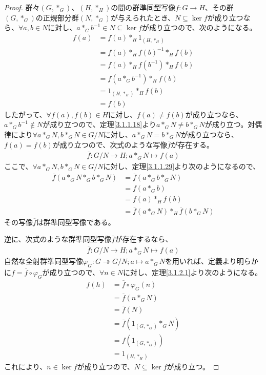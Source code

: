 \documentclass[dvipdfmx]{jsarticle}
\begin{document}
\begin{proof}
群々$\left( G,*_{G} \right)$、$\left( H,*_{H} \right)$の間の群準同型写像$f:G \rightarrow H$、その群$\left( G,*_{G} \right)$の正規部分群$\left( N,*_{G} \right)$が与えられたとき、$N \subseteq \ker f$が成り立つなら、$\forall a,b \in N$に対し、$a*_{G}b^{- 1} \in N \subseteq \ker f$が成り立つので、次のようになる。
\begin{align*}
f(a) &= f(a)*_{H}1_{\left( H,*_{H} \right)}\\
&= f(a)*_{H}{f(b)}^{- 1}*_{H}f(b)\\
&= f(a)*_{H}f\left( b^{- 1} \right)*_{H}f(b)\\
&= f\left( a*_{G}b^{- 1} \right)*_{H}f(b)\\
&= 1_{\left( H,*_{H} \right)}*_{H}f(b)\\
&= f(b)
\end{align*}
したがって、$\forall f(a),f(b) \in H$に対し、$f(a) \neq f(b)$が成り立つなら、$a*_{G}b^{- 1} \notin N$が成り立つので、定理\ref{3.1.1.18}より$a*_{G}N \neq b*_{G}N$が成り立つ。対偶律により$\forall a*_{G}N,b*_{G}N \in {G}/{N}$に対し、$a*_{G}N = b*_{G}N$が成り立つなら、$f(a) = f(b)$が成り立つので、次式のような写像$\overline{f}$が存在する。
\begin{align*}
\overline{f}:{G}/{N} \rightarrow H;a*_{G}N \mapsto f(a)
\end{align*}
ここで、$\forall a*_{G}N,b*_{G}N \in {G}/{N}$に対し、定理\ref{3.1.1.29}より次のようになるので、
\begin{align*}
\overline{f}\left( a*_{G}N*_{G}b*_{G}N \right) &= \overline{f}\left( a*_{G}b*_{G}N \right)\\
&= f\left( a*_{G}b \right)\\
&= f(a)*_{H}f(b)\\
&= \overline{f}\left( a*_{G}N \right)*_{H}\overline{f}\left( b*_{G}N \right)
\end{align*}
その写像$\overline{f}$は群準同型写像である。\par
逆に、次式のような群準同型写像$\overline{f}$が存在するなら、
\begin{align*}
\overline{f}:{G}/{N} \rightarrow H;a*_{G}N \mapsto f(a)
\end{align*}
自然な全射群準同型写像$\varphi_{G}:G \twoheadrightarrow {G}/{N};a \mapsto a*_{G}N$を用いれば、定義より明らかに$f = \overline{f} \circ \varphi_{G}$が成り立つので、$\forall n \in N$に対し、定理\ref{3.1.2.1}より次のようになる。
\begin{align*}
f(h) &= \overline{f} \circ \varphi_{G}(n)\\
&= \overline{f}\left( n*_{G}N \right)\\
&= \overline{f}(N)\\
&= \overline{f}\left( 1_{\left( G,*_{G} \right)}*_{G}N \right)\\
&= f\left( 1_{\left( G,*_{G} \right)} \right)\\
&= 1_{\left( H,*_{H} \right)}
\end{align*}
これにより、$n \in \ker f$が成り立つので、$N \subseteq \ker f$が成り立つ。
\end{proof}
\end{document}
